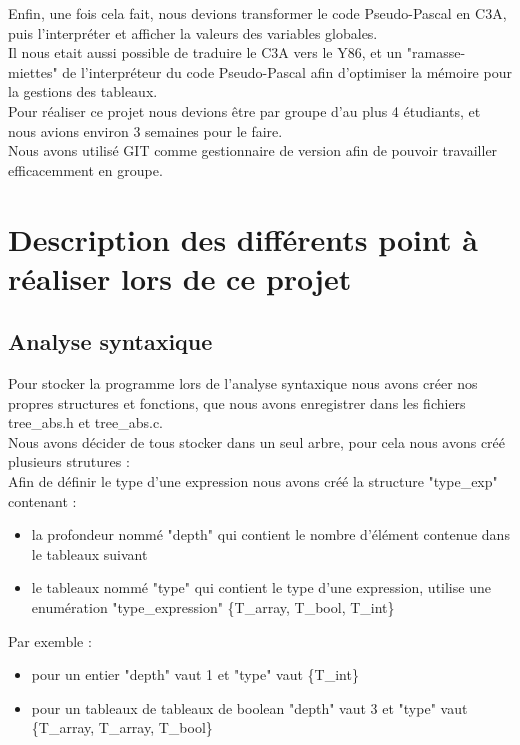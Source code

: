 \documentclass{report}
\begin{document}
Enfin, une fois cela fait, nous devions transformer le code Pseudo-Pascal en C3A, puis l'interpréter et afficher la valeurs des variables globales.\\

Il nous etait aussi possible de traduire le C3A vers le Y86, et un "ramasse-miettes" de l'interpréteur du code Pseudo-Pascal afin d'optimiser la mémoire pour la gestions des tableaux.\\

Pour réaliser ce projet nous devions être par groupe d'au plus 4 étudiants, et nous avions environ 3 semaines pour le faire.\\

Nous avons utilisé GIT comme gestionnaire de version afin de pouvoir travailler efficacemment en groupe.

\newpage

\section{Description des différents point à réaliser lors de ce projet}
\subsection{Analyse syntaxique}
Pour stocker la programme lors de l'analyse syntaxique nous avons créer nos propres structures et fonctions, que nous avons enregistrer dans les fichiers tree\_abs.h et tree\_abs.c.\\

Nous avons décider de tous stocker dans un seul arbre, pour cela nous avons créé plusieurs strutures :\\

Afin de définir le type d'une expression nous avons créé la structure "type\_exp" contenant :
\begin{itemize}
\item la profondeur nommé "depth" qui contient le nombre d'élément contenue dans le tableaux suivant
\item le tableaux nommé "type" qui contient le type d'une expression, utilise une enumération "type\_expression" \{T\_array, T\_bool, T\_int\}
\end{itemize}
Par exemble :
\begin{itemize}
\item pour un entier "depth" vaut 1 et "type" vaut \{T\_int\}
\item pour un tableaux de tableaux de boolean "depth" vaut 3 et "type" vaut \{T\_array, T\_array, T\_bool\}
\end{itemize}
\bigskip
\end{document}
